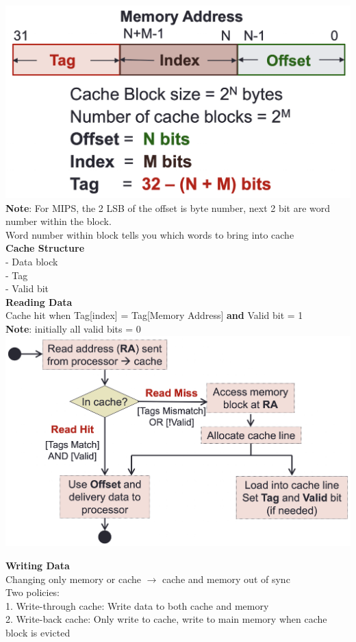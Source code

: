 \documentclass[10pt, a4paper]{article}
\newcommand{\highlight}[1]{{\color{red}\textbf{#1}}}
\begin{document}
\begin{multicols*}{3}
		\includegraphics[scale=.3]{./assets/DirectCacheBits}\\
		\highlight{Note}: For MIPS, the 2 LSB of the offset is byte number, next 2 bit are word number within the block.\\
		Word number within block tells you which words to bring into cache\\

		\textbf{Cache Structure}\\
		- Data block\\
		- Tag\\
		- Valid bit\\

		\textbf{Reading Data}\\
		Cache hit when Tag[index] = Tag[Memory Address] \highlight{and}
		Valid bit = 1\\
		\highlight{Note}: initially all valid bits = 0\\
		\includegraphics[scale=.22]{./assets/readCacheData}

		\textbf{Writing Data}\\
		Changing only memory or cache $\rightarrow$ cache and memory out of sync\\
		Two policies:\\
		1. Write-through cache: Write data to both cache and memory\\
		2. Write-back cache: Only write to cache, write to main memory when cache block is evicted\\


\end{multicols*}
\end{document}
